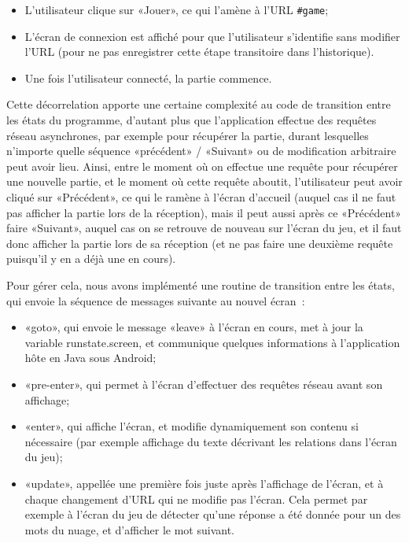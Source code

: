 \documentclass[a4paper,11pt,french]{article}
\begin{document}
\begin{itemize}
\item L'utilisateur clique sur «Jouer», ce qui l'amène à l'URL \verb!#game!;
\item L'écran de connexion est affiché pour que l'utilisateur s'identifie sans modifier l'URL (pour ne pas enregistrer cette étape
  transitoire dans l'historique).
\item Une fois l'utilisateur connecté, la partie commence.
\end{itemize}

Cette décorrelation apporte une certaine complexité au code de transition entre les états du programme, d'autant plus que l'application
effectue des requêtes réseau asynchrones, par exemple pour récupérer la partie, durant lesquelles n'importe quelle séquence «précédent» /
«Suivant» ou de modification arbitraire peut avoir lieu. Ainsi, entre le moment où on effectue une requête pour récupérer une nouvelle
partie, et le moment où cette requête aboutit, l'utilisateur peut avoir cliqué sur «Précédent», ce qui le ramène à l'écran d'accueil (auquel
cas il ne faut pas afficher la partie lors de la réception), mais il peut aussi après ce «Précédent» faire «Suivant», auquel cas on se
retrouve de nouveau sur l'écran du jeu, et il faut donc afficher la partie lors de sa réception (et ne pas faire une deuxième requête
puisqu'il y en a déjà une en cours).

Pour gérer cela, nous avons implémenté une routine de transition entre les états, qui envoie la séquence de messages suivante au nouvel
écran~:
\begin{itemize}
\item «goto», qui envoie le message «leave» à l'écran en cours, met à jour la variable runstate.screen, et communique quelques informations
  à l'application hôte en Java sous Android;
\item «pre-enter», qui permet à l'écran d'effectuer des requêtes réseau avant son affichage;
\item «enter», qui affiche l'écran, et modifie dynamiquement son contenu si nécessaire (par exemple affichage du texte décrivant les
  relations dans l'écran du jeu);
\item «update», appellée une première fois juste après l'affichage de l'écran, et à chaque changement d'URL qui ne modifie pas l'écran. Cela
  permet par exemple à l'écran du jeu de détecter qu'une réponse a été donnée pour un des mots du nuage, et d'afficher le mot suivant.
\end{itemize}
\end{document}
